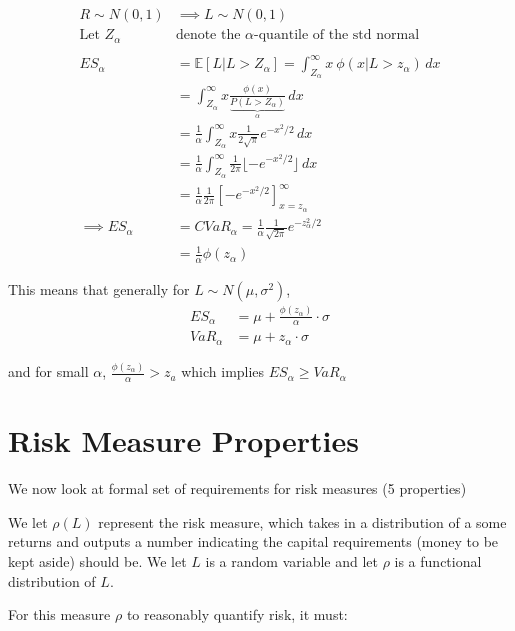 \documentclass[
  oneside]{book}
\begin{document}
\[
\begin{aligned}
R\sim N(0,1) &\implies L \sim N(0,1)\\
\text{Let } Z_{\alpha} &\text{denote the } \alpha \text{-quantile of the std normal}\\
\\
ES_{\alpha} &= \mathbb{E}[L|L>Z_{\alpha}] = \int ^{\infty}_{Z_{\alpha}} x \ \phi(x| L> z_{\alpha}) \, dx\\
&= \int ^{\infty}_{Z_{\alpha}} x \frac{\phi(x)}{\underbrace{ P(L > Z_{\alpha}) }_{ \alpha }}\, dx \\
&= \frac{1}{\alpha}\int ^{\infty}_{Z_{\alpha}} x \frac{1}{2\sqrt{ \pi }}e^{-x^{2}/2}\, dx \\
&= \frac{1}{\alpha}  \int ^{\infty}_{Z_{\alpha}}\frac{1}{2\pi} \lfloor-e^{-x^{2}/2}\rfloor  \, dx \\
&= \frac{1}{\alpha} \frac{1}{2\pi} \left[-e^{-x^{2}/2}\right]^{\infty}_{x=z_{\alpha}}\\
\implies ES_{\alpha} &= CVaR_{\alpha} = \frac{1}{\alpha}\frac{1}{\sqrt{ 2\pi }}e^{-z_{\alpha}^{2}/2}\\
&= \frac{1}{\alpha} \phi(z_{\alpha})
\end{aligned}
\]

This means that generally for \(L\sim N(\mu, \sigma^{2})\),
\[
\begin{aligned}
ES_{\alpha} &= \mu + \frac{\phi(z_{\alpha})}{\alpha} \cdot \sigma\\
VaR_{\alpha} &= \mu +z_{\alpha}\cdot \sigma
\end{aligned}
\]

and for small \(\alpha\), \(\frac{\phi(z_{\alpha})}{\alpha} > z_{a}\) which implies \(ES_{\alpha}\geq VaR_{\alpha}\)

\hypertarget{risk-measure-properties}{%
\section{Risk Measure Properties}\label{risk-measure-properties}}

We now look at formal set of requirements for risk measures (5 properties)

We let \(\rho(L)\) represent the risk measure, which takes in a distribution of a some returns and outputs a number indicating the capital requirements (money to be kept aside) should be.
We let \(L\) is a random variable and let \(\rho\) is a functional distribution of \(L\).

For this measure \(\rho\) to reasonably quantify risk, it must:
\end{document}
